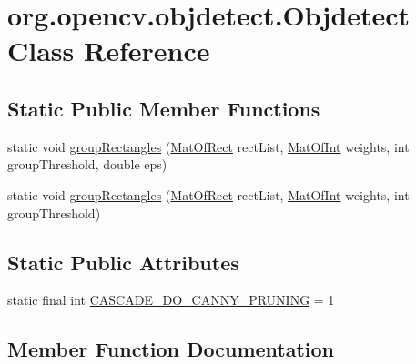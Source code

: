 \hypertarget{classorg_1_1opencv_1_1objdetect_1_1_objdetect}{}\section{org.\+opencv.\+objdetect.\+Objdetect Class Reference}
\label{classorg_1_1opencv_1_1objdetect_1_1_objdetect}
\subsection*{Static Public Member Functions}
\begin{DoxyCompactItemize}
\item 
static void \mbox{\hyperlink{classorg_1_1opencv_1_1objdetect_1_1_objdetect_a191a5f60a172b0995d608c60c0bda94a}{group\+Rectangles}} (\mbox{\hyperlink{classorg_1_1opencv_1_1core_1_1_mat_of_rect}{Mat\+Of\+Rect}} rect\+List, \mbox{\hyperlink{classorg_1_1opencv_1_1core_1_1_mat_of_int}{Mat\+Of\+Int}} weights, int group\+Threshold, double eps)
\item 
static void \mbox{\hyperlink{classorg_1_1opencv_1_1objdetect_1_1_objdetect_afc480a65db1a8f163fd502f3078b47a4}{group\+Rectangles}} (\mbox{\hyperlink{classorg_1_1opencv_1_1core_1_1_mat_of_rect}{Mat\+Of\+Rect}} rect\+List, \mbox{\hyperlink{classorg_1_1opencv_1_1core_1_1_mat_of_int}{Mat\+Of\+Int}} weights, int group\+Threshold)
\end{DoxyCompactItemize}
\subsection*{Static Public Attributes}
\begin{DoxyCompactItemize}
\item 
static final int \mbox{\hyperlink{classorg_1_1opencv_1_1objdetect_1_1_objdetect_a83223136aeee1402bbf0b95ec7efa0d8}{C\+A\+S\+C\+A\+D\+E\+\_\+\+D\+O\+\_\+\+C\+A\+N\+N\+Y\+\_\+\+P\+R\+U\+N\+I\+NG}} = 1
\end{DoxyCompactItemize}


\subsection{Member Function Documentation}
\mbox{\label{classorg_1_1opencv_1_1objdetect_1_1_objdetect_a191a5f60a172b0995d608c60c0bda94a}} 
